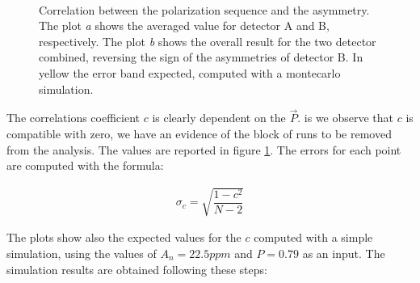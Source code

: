 \begin{figure}[hbtp]
\centering
{} \\
\caption{Correlation between the polarization sequence and the asymmetry. The plot \textit{a} shows the averaged value for detector A and B, respectively. The plot \textit{b} shows the overall result for the two detector combined, reversing the sign of the asymmetries of detector B. In yellow the error band expected, computed with a montecarlo simulation.}
\label{fig:PolarityCheck}
\end{figure}

The correlations coefficient $c$ is clearly dependent on the $\vec{P}$. is we observe that $c$ is compatible with zero, we have an evidence of the block of runs to be removed from the analysis.
The values are reported in figure \ref{fig:PolarityCheck}. The errors for each point are computed with the formula:

\begin{align*}
\sigma_{c} = \sqrt{\dfrac{1 - c^{2}}{N - 2}}
\end{align*} 

The plots show also the expected values for the $c$ computed with a simple simulation, using the values of $A_{n} = 22.5 ppm$ and $P = 0.79$ as an input. The simulation results are obtained following these steps:

